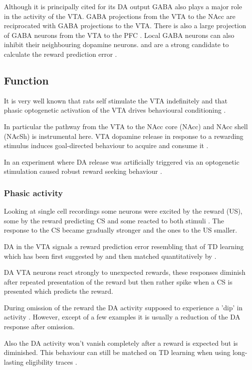 \documentclass[12pt,a4paper]{article}
\begin{document}
Although it is principally cited for its DA output GABA also plays a
major role in the activity of the VTA.  GABA projections from the VTA
to the NAcc are reciprocated with GABA projections to the VTA. There
is also a large projection of GABA neurons from the VTA to the PFC
\citep{Carr2000}. Local GABA neurons can also inhibit their
neighbouring dopamine neurons.\citep{Sesack2010} and are a strong
candidate to calculate the reward prediction error \citep{Eshel2015}.


\subsection{Function}
It is very well known that rats self stimulate the VTA indefinitely
\citep{Stuber2016} and that phasic optogenetic activation of the VTA
drives behavioural conditioning \citep{Tsai2009}.

In particular the pathway from the VTA to the NAcc core (NAcc) and NAcc
shell (NAcSh) is instrumental here. VTA dopamine release in response
to a rewarding stimulus induces goal-directed behaviour to acquire and
consume it \citep{Morales2017}.

In an experiment where DA release was artificially triggered via an
optogenetic stimulation caused robust reward seeking behaviour
\citep{Steinberg2013}.

\subsubsection{Phasic activity}
Looking at single cell recordings some neurons were excited by the
reward (US), some by the reward predicting CS and some reacted to both
stimuli \citep{Cohen2012}. The response to the CS became gradually
stronger and the ones to the US smaller.

DA in the VTA signals a reward prediction error resembling that of TD
learning which has been first suggested by \citep{Schultz1997} and
then matched quantitatively by \citep{Bayer2005}.

DA VTA neurons react strongly to unexpected rewards, these responses
diminish after repeated presentation of the reward but then rather
spike when a CS is presented which predicts the reward.

During omission of the reward the DA activity supposed to experience a
'dip' in activity \citep{Takahashi2017}. However, except of a few
examples it is usually a reduction of the DA response after omission.

Also the DA activity won't vanish completely after a reward is
expected but is diminished. This behaviour can still be matched on TD
learning when using long-lasting eligibility traces \citep{Pan2005}.
\end{document}
